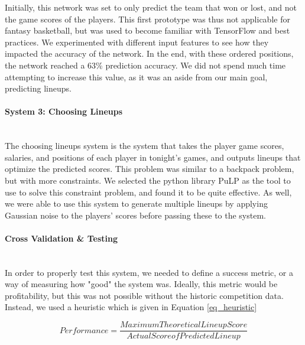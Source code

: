 Initially, this network was set to only predict the team that won or lost, and not the game scores of the players. This first prototype was thus not applicable for fantasy basketball, but was used to become familiar with TensorFlow and best practices. We experimented with different input features to see how they impacted the accuracy of the network. In the end, with these ordered positions, the network reached a 63\% prediction accuracy. We did not spend much time attempting to increase this value, as it was an aside from our main goal, predicting lineups.


\paragraph{System 3: Choosing Lineups}\mbox{}\\
The choosing lineups system is the system that takes the player game scores, salaries, and positions of each player in tonight's games, and outputs lineups that optimize the predicted scores. This problem was similar to a backpack problem, but with more constraints. We selected the python library PuLP as the tool to use to solve this constraint problem, and found it to be quite effective. As well, we were able to use this system to generate multiple lineups by applying Gaussian noise to the players' scores before passing these to the system.

\paragraph{Cross Validation \& Testing}\mbox{}\\
In order to properly test this system, we needed to define a success metric, or a way of measuring how "good" the system was. Ideally, this metric would be profitability, but this was not possible without the historic competition data. Instead, we used a heuristic which is given in Equation \ref{eq_heuristic}

\begin{equation}
Performance = \frac{Maximum Theoretical Lineup Score}{Actual Score of Predicted Lineup}
\label{eq_heuristic}
\end{equation}

